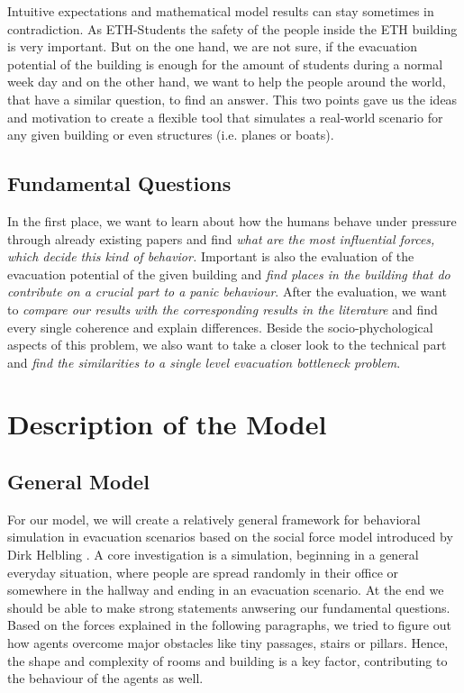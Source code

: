 \documentclass[11pt]{article}
\begin{document}
Intuitive expectations and mathematical model results can stay sometimes in
contradiction. As ETH-Students the safety of the people inside the ETH building
is very important. But on the one hand, we are not sure, if the evacuation
potential of the building is enough for the amount of students during a normal
week day and on the other hand, we want to help the people around the world,
that have a similar question, to find an answer. This two points gave us the
ideas and motivation to create a flexible tool that simulates a real-world
scenario for any given building or even structures (i.e. planes or boats).

\subsection{Fundamental Questions}

In the first place, we want to learn about how the humans behave under pressure
through already existing papers \cite{AACIBF} \cite{ACPPD}  \cite{SDFEP}
\cite{DCD} and find \textit{ what are the most influential forces, which decide
this kind of behavior.} Important is also the evaluation of the evacuation
potential of the given building and \textit{find places in the building that do
contribute on a crucial part to a panic behaviour}.  After the evaluation, we
want to \textit{compare our results with the corresponding results in the
literature} and find every single coherence and explain differences. Beside the
socio-phychological aspects of this problem, we also want to take a closer look
to the technical part and \textit{find the similarities to a single level
evacuation bottleneck problem}.

\section{Description of the Model}
\subsection{General Model}

For our model, we will create a relatively general framework for behavioral
simulation in evacuation scenarios based on the social force model introduced by Dirk Helbling \cite{SDFEP}.
A core investigation is a simulation, beginning in a general everyday situation,
where people are spread randomly in their office or somewhere in the hallway and ending in an evacuation scenario.
At the end we should be able to make strong
statements anwsering our fundamental questions.
Based on the forces explained in the following paragraphs, we tried to figure
out how agents overcome major obstacles like tiny passages, stairs or pillars. Hence, the
shape and complexity of rooms and building is a key factor, contributing to the behaviour of the
agents as well. 
\end{document}
